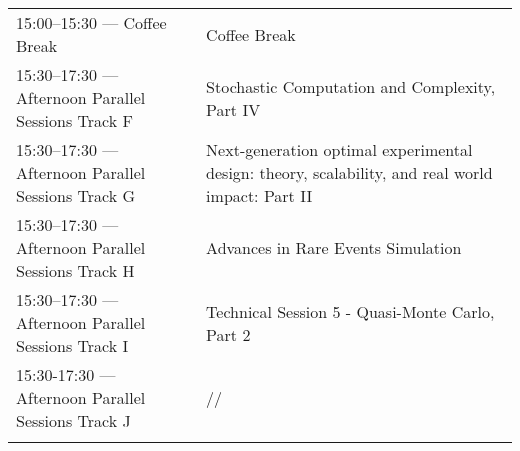 \begin{sideways}
\begin{tabular}{l|l}
\cellcolor{\EmptyColor}15:00–15:30 — Coffee Break & \cellcolor{\EmptyColor}Coffee Break \\
\cellcolor{\SessionTitleColor}15:30–17:30 — Afternoon Parallel Sessions Track F & \cellcolor{\SessionTitleColor}Stochastic Computation and Complexity, Part IV \\
\cellcolor{\SessionTitleColor}15:30–17:30 — Afternoon Parallel Sessions Track G & \cellcolor{\SessionTitleColor}Next-generation optimal experimental design: theory, scalability, and real world impact: Part II \\
\cellcolor{\SessionTitleColor}15:30–17:30 — Afternoon Parallel Sessions Track H & \cellcolor{\SessionTitleColor}Advances in Rare Events Simulation  \\
\cellcolor{\SessionLightColor}15:30–17:30 — Afternoon Parallel Sessions Track I & \cellcolor{\SessionLightColor}Technical Session 5 - Quasi-Monte Carlo, Part 2 \\
\cellcolor{\SessionTitleColor}15:30-17:30 — Afternoon Parallel Sessions Track J & \cellcolor{\SessionTitleColor}// \\
\cellcolor{\SessionTitleColor} & \cellcolor{\SessionTitleColor} \\
\hline
\end{tabular}
\end{sideways}

